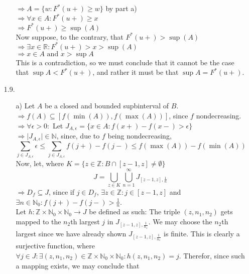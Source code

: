 \documentclass[11pt]{article}
\newcommand{\Z}{\mathbb{Z}}
\newcommand{\R}{\mathbb{R}}
\newcommand{\N}{\mathbb{N}}
\newcommand{\un}[1]{\bigcup_{#1 =1}^\infty}
\theoremstyle{definition}
\begin{document}
\begin{itemize}
\begin{itemize}
                \( \Rightarrow A = \{w:F^*(u+)\geq w\} \) by part a) \\
                \( \Rightarrow \forall x \in A: F^*(u+)\geq x \) \\
                \( \Rightarrow F^*(u+)\geq \sup(A) \) \\
                Now suppose, to the contrary, that \(F^*(u+)> \sup(A)\) \\
                \( \Rightarrow \exists x\in \R : F^*(u+)>x>\sup(A) \) \\
                \( \Rightarrow x\in A \mbox{ and } x>\sup A \) \\
                This is a contradiction, so we must conclude that it cannot be the case that \(\sup A < F^*(u+)\), and rather it must be that \(\sup A = F^*(u+)\).
        \end{itemize}
    \item[1.9.]
        \begin{itemize}
            \item[a)]
                Let $A$ be a closed and bounded supbinterval of $B$.\\
                \( \Rightarrow f(A)\subseteq [f(\min(A)),f(\max(A))] \), since $f$ nondecreasing. \\
                \( \Rightarrow \forall \epsilon>0:\) Let \(J_{A,\epsilon}=\{x\in A:f(x+)-f(x-)>\epsilon\} \) \\
                \( \Rightarrow \vert J_{A,\epsilon}\vert\in \N \), since, due to $f$ being nondecreasing, \\
                \[ \sum_{j\in J_{A,\epsilon}} \epsilon \leq \sum_{j\in J_{A,\epsilon}} f(j+)-f(j-) \leq f(\max(A)) - f(\min(A)) \]
                Now, let, where \(K=\{z\in\Z : B\cap [z-1,z] \neq \emptyset\}\)  \\
                \[ J=\bigcup_{z\in K} \un{n} J_{[z-1,z],\frac{1}{n}} \]
                \( \Rightarrow D_f\subseteq J\), since if \(j\in D_f\), \(\exists z\in \Z: j\in[z-1,z] \) and \(\exists n\in \N_0: f(j+)-f(j-)>\frac{1}{n} \). \\
                Let \(h:\Z \times \N_0 \times \N_0 \to J\) be defined as such: The triple \((z,n_1,n_2)\) gets mapped to the $n_2$th largest $j$ in \(J_{[z-1,z],\frac{1}{n_1}}\).
                We may choose the $n_2$th largest since we have already shown \(J_{[z-1,z],\frac{1}{n_1}}\) is finite. This is clearly a surjective function, where 
                \(\forall j\in J: \exists (z,n_1,n_2)\in \Z \times \N_0 \times \N_0 : h(z,n_1,n_2) = j \). Therefor, since such a mapping exists, we may conclude that

\end{itemize}
\end{itemize}
\end{document}
